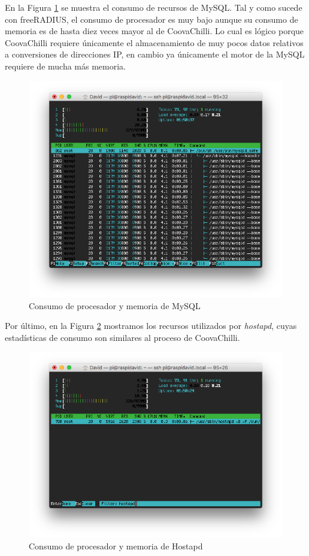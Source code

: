 En la Figura \ref{htopMySQL} se muestra el consumo de recursos de MySQL. Tal y como sucede con freeRADIUS, el consumo de procesador es muy bajo aunque su consumo de memoria es de hasta diez veces mayor al de CoovaChilli. Lo cual es lógico porque CoovaChilli requiere únicamente el almacenamiento de muy pocos datos relativos a conversiones de direcciones IP, en cambio ya únicamente el motor de la MySQL requiere de mucha más memoria.

\begin{figure}[!t]
\begin{center}
\includegraphics[width=0.75\linewidth]{./6_EvalEmpirica/Img/htopMySQL.png}
\end{center}
\caption{Consumo de procesador y memoria de MySQL}
\label{htopMySQL}
\end{figure}

Por último, en la Figura \ref{htopHostapd} mostramos los recursos utilizados por \emph{hostapd}, cuyas estadísticas de consumo son similares al proceso de CoovaChilli.

\begin{figure}[!t]
\begin{center}
\includegraphics[width=0.75\linewidth]{./6_EvalEmpirica/Img/htopHostapd.png}
\end{center}
\caption{Consumo de procesador y memoria de Hostapd}
\label{htopHostapd}
\end{figure}

